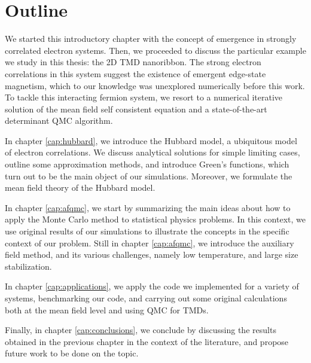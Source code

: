 \section{Outline}
\label{sec:int_outline}

We started this introductory chapter with the concept of emergence in strongly correlated electron systems.
Then, we proceeded to discuss the particular example we study in this thesis: the \acs{2D} \acs{TMD} nanoribbon.
The strong electron correlations in this system suggest the existence of emergent edge-state magnetism, which to our knowledge was unexplored numerically before this work.
To tackle this interacting fermion system, we resort to a numerical iterative solution of the mean field self consistent equation and a state-of-the-art determinant \ac{QMC} algorithm.

In chapter \ref{cap:hubbard}, we introduce the Hubbard model, a ubiquitous model of electron correlations.
We discuss analytical solutions for simple limiting cases, outline some approximation methods, and introduce Green's functions, which turn out to be the main object of our simulations.
Moreover, we formulate the mean field theory of the Hubbard model.

In chapter \ref{cap:afqmc}, we start by summarizing the main ideas about how to apply the Monte Carlo method to statistical physics problems.
In this context, we use original results of our simulations to illustrate the concepts in the specific context of our problem.
Still in chapter \ref{cap:afqmc}, we introduce the auxiliary field method, and its various challenges, namely low temperature, and large size stabilization.

In chapter \ref{cap:applications}, we apply the code we implemented for a variety of systems, benchmarking our code, and carrying out some original calculations both at the mean field level and using \acs{QMC} for \acp{TMD}.

Finally, in chapter \ref{cap:conclusions}, we conclude by discussing the results obtained in the previous chapter in the context of the literature, and propose future work to be done on the topic.